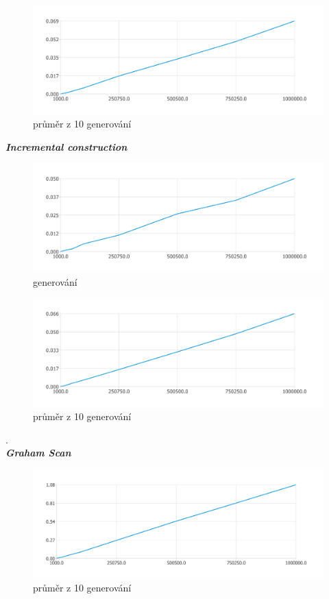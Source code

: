 \documentclass{article}
\begin{document}
\begin{figure}[htbp]
\centering
        \includegraphics[clip, trim=0cm 0cm 0cm 0cm, width=1\textwidth]{rang.pdf}
        \caption{průměr z 10 generování}
\end{figure}
\clearpage
\newpage
\textit{\textbf {Incremental construction}}
\\
\begin{figure}[htbp]
\centering
        \includegraphics[clip, trim=0cm 0cm 0cm 0cm, width=1\textwidth]{pdf7.pdf}
        \caption{generování}
\end{figure}
\begin{figure}[htbp]
\centering
        \includegraphics[clip, trim=0cm 0cm 0cm 0cm, width=1\textwidth]{rani.pdf}
        \caption{průměr z 10 generování}
\end{figure}
.\\
\clearpage
\newpage
\textit{\textbf {Graham Scan}}
\\
\begin{figure}[htbp]
\centering
        \includegraphics[clip, trim=0cm 0cm 0cm 0cm, width=1\textwidth]{rgs.pdf}
        \caption{průměr z 10 generování}
\end{figure}
\clearpage
\newpage
\end{document}
